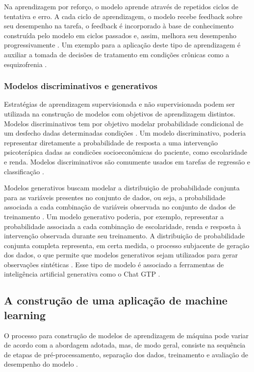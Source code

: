 Na aprendizagem por reforço, o modelo aprende através de repetidos ciclos de tentativa e erro. A cada ciclo de aprendizagem, o modelo recebe feedback sobre seu
desempenho na tarefa, o feedback é incorporado à base de conhecimento construída pelo modelo em ciclos passados e, assim, melhora seu desempenho progressivamente
\cite{Theobald2021, Bi2019}. Um exemplo para a aplicação deste tipo de aprendizagem é auxiliar a tomada de decisões de tratamento em condições crônicas como a
esquizofrenia \cite{Shortreed2010}.

\subsubsection{Modelos discriminativos e generativos}

Estratégias de aprendizagem supervisionada e não supervisionada podem ser utilizada na construção de modelos com objetivos de aprendizagem distintos. Modelos
discriminativos tem por objetivo modelar probabilidade condicional de um desfecho dadas determinadas condições \cite{Bi2019, Ng2001}. Um modelo discriminativo,
poderia representar diretamente a probabilidade de resposta a uma intervenção psicoterápica dadas as condicões socioeconômicas do paciente, como escolaridade e
renda. Modelos discriminativos são comumente usados em tarefas de regressão e classificação \cite{Bi2019}.

Modelos generativos buscam modelar a distribuição de probabilidade conjunta para as variáveis presentes no conjunto de dados, ou seja, a probabilidade associada
a cada combinação de variáveis observada no conjunto de dados de treinamento \cite{Bi2019, Ng2001}. Um modelo generativo poderia, por exemplo, representar a
probabilidade associada a cada combinação de escolaridade, renda e resposta à intervenção observada durante seu treinamento. A distribuição de probabilidade
conjunta completa representa, em certa medida, o processo subjacente de geração dos dados, o que permite que modelos generativos sejam utilizados para gerar
observações sintéticas \cite{Bi2019}. Esse tipo de modelo é associado a ferramentas de inteligência artificial generativa como o Chat GTP \cite{Wu2023}.

\subsection{A construção de uma aplicação de machine learning}

O processo para construção de modelos de aprendizagem de máquina pode variar de acordo com a abordagem adotada, mas, de modo geral, consiste na sequência de etapas
de pré-processamento, separação dos dados, treinamento e avaliação de desempenho do modelo \cite{Greener2021}.

